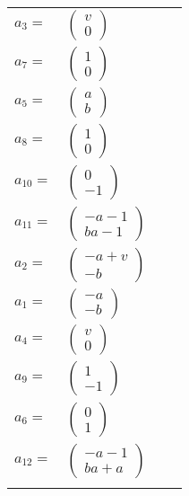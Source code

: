 \documentclass[1p]{elsarticle_modified}
\theoremstyle{definition}
\begin{document}
\begin{tabular}{m{7pt} m{180pt} m{7pt} m{180pt} }
\flushright $a_{3}=$&$\begin{pmatrix}v\\0\end{pmatrix}$ \\
\flushright $a_{7}=$&$\begin{pmatrix}1\\0\end{pmatrix}$ \\
\flushright $a_{5}=$&$\begin{pmatrix}a\\b\end{pmatrix}$ \\
\flushright $a_{8}=$&$\begin{pmatrix}1\\0\end{pmatrix}$ \\
\flushright $a_{10}=$&$\begin{pmatrix}0\\-1\end{pmatrix}$ \\
\flushright $a_{11}=$&$\begin{pmatrix}- a-1\\b a-1\end{pmatrix}$ \\
\flushright $a_{2}=$&$\begin{pmatrix}- a+v\\- b\end{pmatrix}$ \\
\flushright $a_{1}=$&$\begin{pmatrix}- a\\- b\end{pmatrix}$ \\
\flushright $a_{4}=$&$\begin{pmatrix}v\\0\end{pmatrix}$ \\
\flushright $a_{9}=$&$\begin{pmatrix}1\\-1\end{pmatrix}$ \\
\flushright $a_{6}=$&$\begin{pmatrix}0\\1\end{pmatrix}$ \\
\flushright $a_{12}=$&$\begin{pmatrix}- a-1\\b a+a\end{pmatrix}$\\&\end{tabular}
\end{document}
